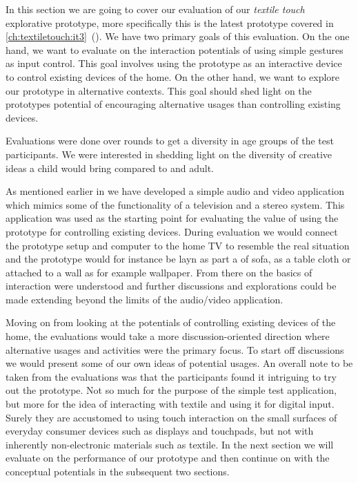 In this section we are going to cover our evaluation of our \emph{textile touch} explorative prototype, more specifically this is the latest prototype covered in \ref{ch:textiletouch:it3}~().
We have two primary goals of this evaluation.
On the one hand, we want to evaluate on the interaction potentials of using simple gestures as input control.
This goal involves using the prototype as an interactive device to control existing devices of the home.
On the other hand, we want to explore our prototype in alternative contexts.
This goal should shed light on the prototypes potential of encouraging alternative usages than controlling existing devices.

Evaluations were done over  rounds to get a diversity in age groups of the test participants.
We were interested in shedding light on the diversity of creative ideas a child would bring compared to and adult.

\blank
As mentioned earlier in \emph{  } we have developed a simple audio and video application which mimics some of the functionality of a television and a stereo system.
This application was used as the starting point for evaluating the value of using the prototype for controlling existing devices.
During evaluation we would connect the prototype setup and computer to the home TV to resemble the real situation and the prototype would for instance be layn as part a of sofa, as a table cloth or attached to a wall as for example wallpaper.
From there on the basics of interaction were understood and further discussions and explorations could be made extending beyond the limits of the audio/video application.

Moving on from looking at the potentials of controlling existing devices of the home, the evaluations would take a more discussion-oriented direction where alternative usages and activities were the primary focus.
To start off discussions we would present some of our own ideas of potential usages.
\blank
An overall note to be taken from the evaluations was that the participants found it intriguing to try out the prototype.
Not so much for the purpose of the simple test application, but more for the idea of interacting with textile and using it for digital input.
Surely they are accustomed to using touch interaction on the small surfaces of everyday consumer devices such as displays and touchpads, but not with inherently non-electronic materials such as textile. 
\blank
In the next section we will evaluate on the performance of our prototype and then continue on with the conceptual potentials in the subsequent two sections.

